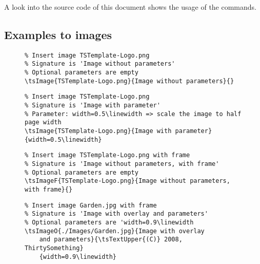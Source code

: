 A look into the source code of this document shows the usage of the commands.

\subsection{Examples to images}

\begin{figure}[H]
    \small
    \centering
    \begin{BVerbatim}
\tsImage{TSTemplate-Logo.png}{Image without parameters}{}
    \end{BVerbatim}
\end{figure}


\begin{figure}[H]
    \small
    \centering
    \begin{BVerbatim}
\tsImage{TSTemplate-Logo.png}{Image with parameter}{width=0.5\linewidth}
    \end{BVerbatim}
\end{figure}


\begin{figure}[H]
    \small
    \centering
    \begin{BVerbatim}
\tsImageF{TSTemplate-Logo.png}{Image without parameters, with frame}{}
    \end{BVerbatim}
\end{figure}


\begin{figure}[H]
    \small
    \centering
    \begin{BVerbatim}
\tsImageO{./Images/Garden.jpg}{Image with overlay
    and parameters}{\tsTextUpper{(C)} 2008, ThirtySomething}
    {width=0.9\linewidth}
    \end{BVerbatim}
\end{figure}

